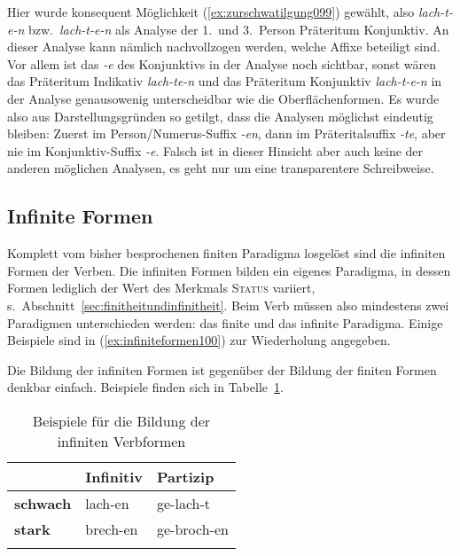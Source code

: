 Hier wurde konsequent Möglichkeit (\ref{ex:zurschwatilgung099}) gewählt, also \textit{lach-t-e-n} bzw.\ \textit{lach-t-e-n} als Analyse der 1.\ und 3.\ Person Präteritum Konjunktiv.
An dieser Analyse kann nämlich nachvollzogen werden, welche Affixe beteiligt sind.
Vor allem ist das \textit{-e} des Konjunktivs in der Analyse noch sichtbar, sonst wären das Präteritum Indikativ \textit{lach-te-n} und das Präteritum Konjunktiv \textit{lach-t-e-n} in der Analyse genausowenig unterscheidbar wie die Oberflächenformen.
Es wurde also aus Darstellungsgründen so getilgt, dass die Analysen möglichst eindeutig bleiben:
Zuerst im Person\slash Numerus-Suffix \textit{-en}, dann im Präteritalsuffix \textit{-te}, aber nie im Konjunktiv-Suffix \textit{-e}.
Falsch ist in dieser Hinsicht aber auch keine der anderen möglichen Analysen, es geht nur um eine transparentere Schreibweise.

\subsection{Infinite Formen}
\label{sec:infiniteformen}


Komplett vom bisher besprochenen finiten Paradigma losgelöst sind die infiniten Formen der Verben.
Die infiniten Formen bilden ein eigenes Paradigma, in dessen Formen lediglich der Wert des Merkmals \textsc{Status} variiert, s.\ Abschnitt~\ref{sec:finitheitundinfinitheit}.
Beim Verb müssen also mindestens zwei Paradigmen unterschieden werden: das finite und das infinite Paradigma.
Einige Beispiele sind in (\ref{ex:infiniteformen100}) zur Wiederholung angegeben.

\begin{exe}
  \ex\label{ex:infiniteformen100}
  \begin{xlist}
  \end{xlist}
\end{exe}

Die Bildung der infiniten Formen ist gegenüber der Bildung der finiten Formen denkbar einfach.
Beispiele finden sich in Tabelle~\ref{tab:infiniteformen101}.


\begin{table}[!htbp]
  \centering
  \begin{tabular}{lll}
    \lsptoprule
    & \textbf{Infinitiv} & \textbf{Partizip} \\
    \midrule
    \textbf{schwach} & lach-en & ge-lach-t\\
    \textbf{stark} & brech-en & ge-broch-en\\
    \lspbottomrule
  \end{tabular}
  \caption{Beispiele für die Bildung der infiniten Verbformen}
  \label{tab:infiniteformen101}
\end{table}

